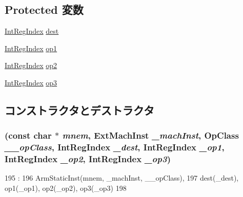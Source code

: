 \subsection*{Protected 変数}
\begin{DoxyCompactItemize}
\item 
\hyperlink{namespaceArmISA_ae64680ba9fb526106829d6bf92fc791b}{IntRegIndex} \hyperlink{classArmISA_1_1DataX3RegOp_aec72e8e45bdc87abeeeb75d2a8a9a716}{dest}
\item 
\hyperlink{namespaceArmISA_ae64680ba9fb526106829d6bf92fc791b}{IntRegIndex} \hyperlink{classArmISA_1_1DataX3RegOp_a4c465c43ad568f8bcf8ae71480e9cfea}{op1}
\item 
\hyperlink{namespaceArmISA_ae64680ba9fb526106829d6bf92fc791b}{IntRegIndex} \hyperlink{classArmISA_1_1DataX3RegOp_a7799ff6cbe5a252199059eb8665820e7}{op2}
\item 
\hyperlink{namespaceArmISA_ae64680ba9fb526106829d6bf92fc791b}{IntRegIndex} \hyperlink{classArmISA_1_1DataX3RegOp_aeebae963914149e59062881eccc25c48}{op3}
\end{DoxyCompactItemize}


\subsection{コンストラクタとデストラクタ}
\hypertarget{classArmISA_1_1DataX3RegOp_adf6274b523e6bdab334965b174377c6e}{
\subsubsection[{DataX3RegOp}]{ (const char $\ast$ {\em mnem}, \/  {\bf ExtMachInst} {\em \_\-machInst}, \/  OpClass {\em \_\-\_\-opClass}, \/  {\bf IntRegIndex} {\em \_\-dest}, \/  {\bf IntRegIndex} {\em \_\-op1}, \/  {\bf IntRegIndex} {\em \_\-op2}, \/  {\bf IntRegIndex} {\em \_\-op3})}}
\label{classArmISA_1_1DataX3RegOp_adf6274b523e6bdab334965b174377c6e}



\begin{DoxyCode}
195                                   :
196         ArmStaticInst(mnem, _machInst, __opClass),
197         dest(_dest), op1(_op1), op2(_op2), op3(_op3)
198     {}

\end{DoxyCode}


